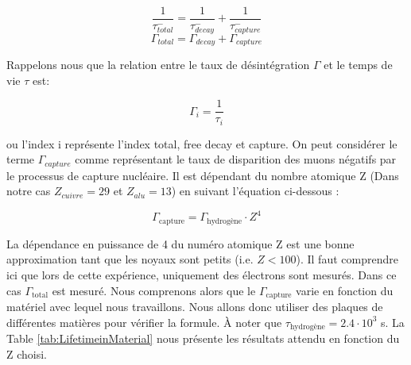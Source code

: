 \documentclass[12pt]{article}
\begin{document}
\begin{equation}
    \frac{1}{\tau_{total}^{-}} = \frac{1}{\tau_{decay}^{-}} + \frac{1}{\tau_{capture}^{-}}
\end{equation}
\begin{equation}
\Gamma_{total} = \Gamma_{decay} + \Gamma_{capture}
\end{equation}

Rappelons nous que la relation entre le taux de désintégration $\Gamma$ et le temps de vie $\tau$ est: 

\begin{equation}
    \Gamma_{i} = \frac{1}{\tau_{i}}
\end{equation}

ou l'index i représente l'index total, free decay et capture. On peut considérer le terme  $\Gamma_{capture}$ comme représentant le taux de disparition des muons négatifs par le processus de capture nucléaire. Il est dépendant du nombre atomique Z (Dans notre cas $Z_{cuivre} = 29$ et $Z_{alu} = 13$) en suivant l'équation ci-dessous \cite{tamamushi_lifetime_nodate}: 

\begin{equation}
     \Gamma_{\text{capture}} =  \Gamma_{\text{hydrogène}} \cdot Z^{4}
\end{equation}

La dépendance en puissance de 4 du numéro atomique Z est une bonne approximation tant que les noyaux sont petits (i.e. $Z<100$). Il faut comprendre ici que lors de cette expérience, uniquement des électrons sont mesurés. Dans ce cas $\Gamma_{\text{total}}$ est mesuré. Nous comprenons alors que le $\Gamma_{\text{capture}}$ varie en fonction du matériel avec lequel nous travaillons. Nous allons donc utiliser des plaques de différentes matières pour vérifier la formule. À noter que $\tau_{\text{hydrogène}}=2.4\cdot10^{3}$ \SIUnitSymbolMicro s. La Table \ref{tab:LifetimeinMaterial} nous présente les résultats attendu en fonction du Z choisi.

\begin{table}[htbp]
  \centering
  \captionsetup{width=0.9\textwidth}
  \caption{Temps de vie des muons positifs et négatifs dans différents matériaux. Le temps de vie des muons positifs est tout le temps 2.2 \SIUnitSymbolMicro s, alors que le temps de vie des muons négatifs dépends du nombre atomique Z \cite{tamamushi_lifetime_nodate}.}
  \label{tab:LifetimeinMaterial}
\end{table}
\end{document}
